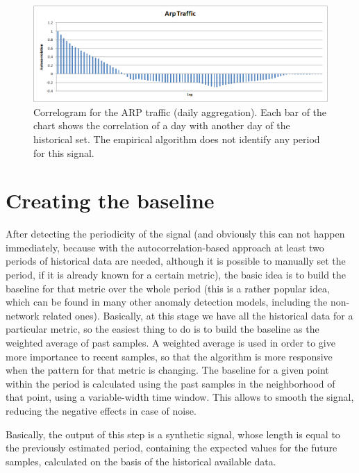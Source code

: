 \documentclass[12pt,a4paper,cucitura]{toptesi}
\begin{document}
\begin{figure}
\centering
\includegraphics[width=\linewidth]{correlogram_arp_2.png}
\caption[Correlogram for the ARP traffic (daily aggregation)]{Correlogram for the ARP traffic (daily aggregation). Each bar of the chart shows the correlation of a day with another day of the historical set. The empirical algorithm does not identify any period for this signal.}
\label{img:correlogram_arp}
\end{figure}

\section{Creating the baseline}

After detecting the periodicity of the signal (and obviously this can not happen immediately, because with the autocorrelation-based approach at least two periods of historical data are needed, although it is possible to manually set the period, if it is already known for a certain metric), the basic idea is to build the baseline for that metric over the whole period (this is a rather popular idea, which can be found in many other anomaly detection models, including the non-network related ones\cite{wsare}).
Basically, at this stage we have all the historical data for a particular metric, so the easiest thing to do is to build the baseline as the weighted average of past samples.
A weighted average is used in order to give more importance to recent samples, so that the algorithm is more responsive when the pattern for that metric is changing.
The baseline for a given point within the period is calculated using the past samples in the neighborhood of that point, using a variable-width time window. This allows to smooth the signal, reducing the negative effects in case of noise.

Basically, the output of this step is a synthetic signal, whose length is equal to the previously estimated period, containing the expected values for the future samples, calculated on the basis of the historical available data.
\end{document}
